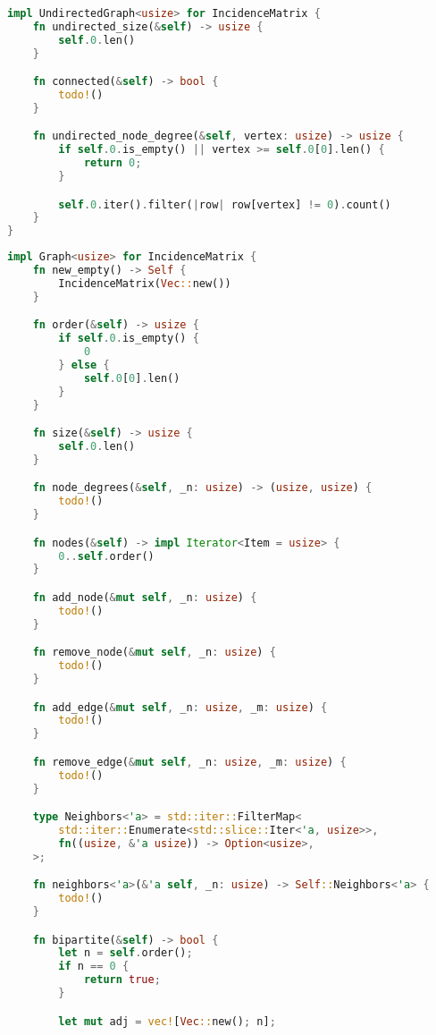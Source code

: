 \begin{lstlisting}[language=Rust, caption={Implementação de UndirectedGraph na Estrutura de Dados Matriz de Incidência}, label=list:impl_inc_mat_ug]
impl UndirectedGraph<usize> for IncidenceMatrix {
    fn undirected_size(&self) -> usize {
        self.0.len()
    }

    fn connected(&self) -> bool {
        todo!()
    }

    fn undirected_node_degree(&self, vertex: usize) -> usize {
        if self.0.is_empty() || vertex >= self.0[0].len() {
            return 0;
        }

        self.0.iter().filter(|row| row[vertex] != 0).count()
    }
}
\end{lstlisting}

\begin{lstlisting}[language=Rust, caption={Implementação de Graph na Estrutura de Dados Matriz de Incidência}, label=list:impl_inc_mat_g]
impl Graph<usize> for IncidenceMatrix {
    fn new_empty() -> Self {
        IncidenceMatrix(Vec::new())
    }

    fn order(&self) -> usize {
        if self.0.is_empty() {
            0
        } else {
            self.0[0].len()
        }
    }

    fn size(&self) -> usize {
        self.0.len()
    }

    fn node_degrees(&self, _n: usize) -> (usize, usize) {
        todo!()
    }

    fn nodes(&self) -> impl Iterator<Item = usize> {
        0..self.order()
    }

    fn add_node(&mut self, _n: usize) {
        todo!()
    }

    fn remove_node(&mut self, _n: usize) {
        todo!()
    }

    fn add_edge(&mut self, _n: usize, _m: usize) {
        todo!()
    }

    fn remove_edge(&mut self, _n: usize, _m: usize) {
        todo!()
    }

    type Neighbors<'a> = std::iter::FilterMap<
        std::iter::Enumerate<std::slice::Iter<'a, usize>>,
        fn((usize, &'a usize)) -> Option<usize>,
    >;

    fn neighbors<'a>(&'a self, _n: usize) -> Self::Neighbors<'a> {
        todo!()
    }

    fn bipartite(&self) -> bool {
        let n = self.order();
        if n == 0 {
            return true;
        }

        let mut adj = vec![Vec::new(); n];


\end{lstlisting}
